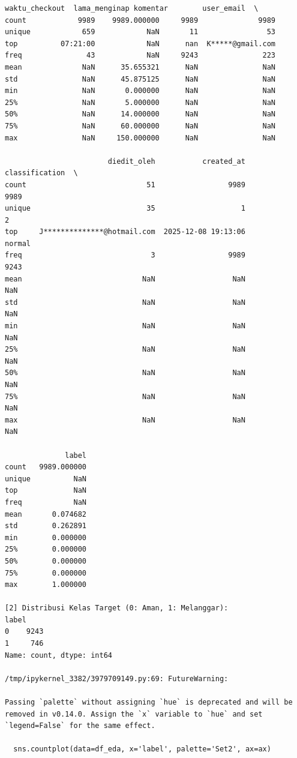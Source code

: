 \begin{lstlisting}[caption={Output 12}]
       waktu_checkout  lama_menginap komentar        user_email  \
count            9989    9989.000000     9989              9989   
unique            659            NaN       11                53   
top          07:21:00            NaN      nan  K*****@gmail.com   
freq               43            NaN     9243               223   
mean              NaN      35.655321      NaN               NaN   
std               NaN      45.875125      NaN               NaN   
min               NaN       0.000000      NaN               NaN   
25%               NaN       5.000000      NaN               NaN   
50%               NaN      14.000000      NaN               NaN   
75%               NaN      60.000000      NaN               NaN   
max               NaN     150.000000      NaN               NaN   

                        diedit_oleh           created_at classification  \
count                            51                 9989           9989   
unique                           35                    1              2   
top     J**************@hotmail.com  2025-12-08 19:13:06         normal   
freq                              3                 9989           9243   
mean                            NaN                  NaN            NaN   
std                             NaN                  NaN            NaN   
min                             NaN                  NaN            NaN   
25%                             NaN                  NaN            NaN   
50%                             NaN                  NaN            NaN   
75%                             NaN                  NaN            NaN   
max                             NaN                  NaN            NaN   

              label  
count   9989.000000  
unique          NaN  
top             NaN  
freq            NaN  
mean       0.074682  
std        0.262891  
min        0.000000  
25%        0.000000  
50%        0.000000  
75%        0.000000  
max        1.000000  

[2] Distribusi Kelas Target (0: Aman, 1: Melanggar):
label
0    9243
1     746
Name: count, dtype: int64

/tmp/ipykernel_3382/3979709149.py:69: FutureWarning: 

Passing `palette` without assigning `hue` is deprecated and will be removed in v0.14.0. Assign the `x` variable to `hue` and set `legend=False` for the same effect.

  sns.countplot(data=df_eda, x='label', palette='Set2', ax=ax)


\end{lstlisting}
